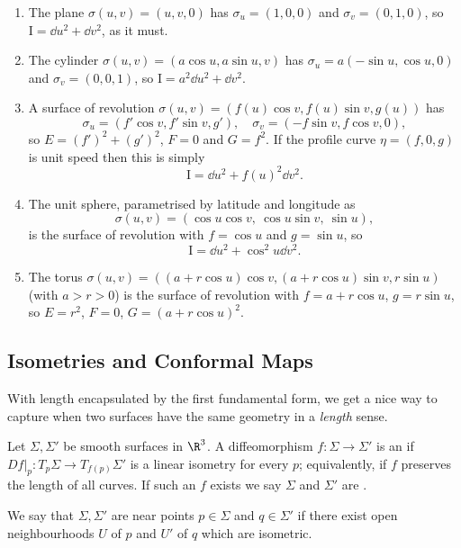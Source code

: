 \begin{example}
    \begin{enumerate}[label=(\roman*)]
        \item The plane $\sigma(u,v) = (u,v,0)$ has $\sigma_u = (1,0,0)$ and $\sigma_v = (0,1,0)$, so $\mathrm{I} = \dd u^2 + \dd v^2$, as it must.
        \item The cylinder $\sigma(u,v) = (a\cos u, a \sin u, v)$ has $\sigma_u = a(-\sin u, \cos u, 0)$ and $\sigma_v = (0,0,1)$, so $\mathrm{I} = a^2 \dd u^2 + \dd v^2$.
        \item A surface of revolution $\sigma(u,v) = (f(u)\cos v, f(u)\sin v, g(u))$ has
        $$
        \sigma_u = (f'\cos v, f'\sin v, g'), \quad \sigma_v = (-f\sin v, f\cos v, 0),
        $$
        so $E = (f')^2 + (g')^2$, $F = 0$ and $G = f^2$. If the profile curve $\eta = (f, 0, g)$ is unit speed then this is simply
        $$
        \mathrm{I} = \dd u^2 + f(u)^2 \dd v^2.
        $$
        \item The unit sphere, parametrised by latitude and longitude as
        $$
        \sigma(u,v) = (\cos u\cos v,\ \cos u \sin v,\ \sin u),
        $$
        is the surface of revolution with $f = \cos u$ and $g = \sin u$, so
        $$
        \mathrm{I} = \dd u^2 + \cos^2 u \dd v^2.
        $$
        \item The torus $\sigma(u,v) = ((a + r\cos u)\cos v, (a+r\cos u)\sin v, r \sin u)$ (with $a > r > 0$) is the surface of revolution with $f = a + r\cos u$, $g = r \sin u$, so $E = r^2$, $F = 0$, $G = (a + r \cos u)^2$.
    \end{enumerate}
\end{example}

\subsection{Isometries and Conformal Maps}

With length encapsulated by the first fundamental form, we get a nice way to capture when two surfaces have the same geometry in a \emph{length} sense.

\begin{definition}[Isometric]
    Let $\Sigma, \Sigma'$ be smooth surfaces in $\R^3$. A diffeomorphism $f: \Sigma \rightarrow \Sigma'$ is an  if $\left.Df\right|_p : T_p\Sigma \rightarrow T_{f(p)}\Sigma'$ is a linear isometry for every $p$; equivalently, if $f$ preserves the length of all curves. If such an $f$ exists we say $\Sigma$ and $\Sigma'$ are .
\end{definition}
\begin{definition}
    We say that $\Sigma, \Sigma'$ are  near points $p \in \Sigma$ and $q \in \Sigma'$ if there exist open neighbourhoods $U$ of $p$ and $U'$ of $q$ which are isometric.
\end{definition}


